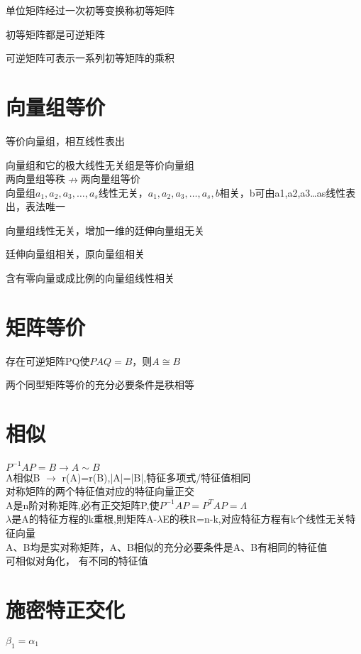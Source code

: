\documentclass[UTF8]{ctexart}
\begin{document}
单位矩阵经过一次初等变换称初等矩阵

初等矩阵都是可逆矩阵

可逆矩阵可表示一系列初等矩阵的乘积

\section{向量组等价}

等价向量组，相互线性表出

向量组和它的极大线性无关组是等价向量组 \\
两向量组等秩$\nrightarrow $两向量组等价  \\
向量组$a_{1},a_{2},a_{3},\ldots,a_{s}$线性无关，$a_{1},a_{2},a_{3},\ldots,a_{s},b$相关，b可由a1,a2,a3…as线性表出，表法唯一

向量组线性无关，增加一维的廷伸向量组无关

廷伸向量组相关，原向量组相关

含有零向量或成比例的向量组线性相关

\section{矩阵等价}

存在可逆矩阵PQ使$PAQ=B$，则$A\cong B$

两个同型矩阵等价的充分必要条件是秩相等

\section{相似}
$P^{-1}AP=B \rightarrow A \sim B$ \\
A相似B $\rightarrow$  r(A)=r(B),|A|=|B|,特征多项式/特征值相同 \\
对称矩阵的两个特征值对应的特征向量正交 \\
A是n阶对称矩阵,必有正交矩阵P,使$P^{-1}AP=P^TAP=\varLambda$ \\
$\lambda$是A的特征方程的k重根,則矩阵A-$\lambda$E的秩R=n-k,对应特征方程有k个线性无关特征向量 \\
A、B均是实对称矩阵，A、B相似的充分必要条件是A、B有相同的特征值 \\
可相似对角化，  有不同的特征值 \\


\section{施密特正交化}

$\beta_{1}=\alpha_{1}$
\end{document}
